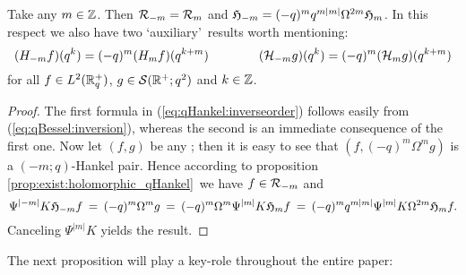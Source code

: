 \begin{prop} \label{prop:qHankel:inverseorder}
Take any $m\in\mathbb{Z}$. Then ${\mathcal R}_{-m} = {\mathcal R}_{m}$ and
$\mathfrak{H}_{-m} = (-q)^m q^{m|m|}\Omega^{2m}\mathfrak{H}_{m}$.
In this respect we also have two \lq auxiliary\rq\ results worth mentioning:
\begin{equation}\label{eq:qHankel:inverseorder}
   (H_{-m} f)(q^k) = (-q)^m (H_m f)(q^{k+m})
      \hspace{4em}
   ({\mathcal H}_{-m} g)(q^k) = (-q)^m ({\mathcal H}_{m} g)(q^{k+m})
\end{equation}
for all $f\in L^2(\mathbb{R}_q^+)$, $g\in {\mathcal S}(\mathbb{R}^+;q^2)$ and $k\in\mathbb{Z}$.
\end{prop}
\begin{proof}
The first formula in (\ref{eq:qHankel:inverseorder}) follows
easily from (\ref{eq:qBessel:inversion}), whereas the second is an
immediate consequence of the first one.
Now let $(f,g)$ be any \Hmpair\@; then it is easy to see that
$(f, (-q)^m \Omega^m g)$ is a \mbox{$(-m;q)$-Hankel} pair.
Hence according to proposition \ref{prop:exist:holomorphic_qHankel}\
we have $f\in {\mathcal R}_{-m}$ and
$$ \Psi^{|-m|} K \mathfrak{H}_{-m}f \:=\: (-q)^m \Omega^m g
      \:=\: (-q)^m \Omega^m \Psi^{|m|} K \mathfrak{H}_{m}f
      \:=\: (-q)^m q^{m|m|} \Psi^{|m|} K \Omega^{2m} \mathfrak{H}_{m} f. $$
Canceling $\Psi^{|m|} K$ yields the result.
\end{proof}

\vspace{1ex}
The next proposition will play a key-role throughout the entire paper:

